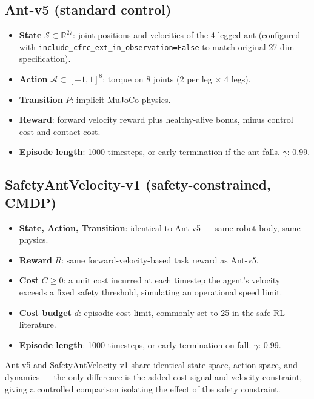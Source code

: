 \documentclass[10pt]{article}
\begin{document}
\subsection*{Ant-v5 (standard control)}
\begin{itemize}[nosep, leftmargin=1.2em]
    \item \textbf{State} $\mathcal{S} \subset \mathbb{R}^{27}$: joint positions and velocities of the 4-legged ant (configured with \texttt{include\_cfrc\_ext\_in\_observation=False} to match original 27-dim specification).
    \item \textbf{Action} $\mathcal{A} \subset [-1,1]^8$: torque on 8 joints (2 per leg $\times$ 4 legs).
    \item \textbf{Transition} $P$: implicit MuJoCo physics.
    \item \textbf{Reward}: forward velocity reward plus healthy-alive bonus, minus control cost and contact cost.
    \item \textbf{Episode length}: 1000 timesteps, or early termination if the ant falls. \quad \textbf{$\gamma$}: 0.99.
\end{itemize}

\subsection*{SafetyAntVelocity-v1 (safety-constrained, CMDP)}
\begin{itemize}[nosep, leftmargin=1.2em]
    \item \textbf{State, Action, Transition}: identical to Ant-v5 --- same robot body, same physics.
    \item \textbf{Reward} $R$: same forward-velocity-based task reward as Ant-v5.
    \item \textbf{Cost} $C \geq 0$: a unit cost incurred at each timestep the agent's velocity exceeds a fixed safety threshold, simulating an operational speed limit.
    \item \textbf{Cost budget} $d$: episodic cost limit, commonly set to 25 in the safe-RL literature.
    \item \textbf{Episode length}: 1000 timesteps, or early termination on fall. \quad \textbf{$\gamma$}: 0.99.
\end{itemize}

Ant-v5 and SafetyAntVelocity-v1 share identical state space, action space, and dynamics --- the only difference is the added cost signal and velocity constraint, giving a controlled comparison isolating the effect of the safety constraint.
\end{document}
